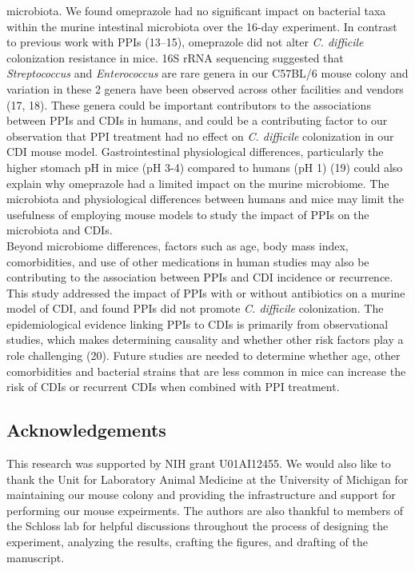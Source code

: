 \documentclass[11pt,]{article}
\begin{document}
microbiota. We found omeprazole had no significant impact on bacterial
taxa within the murine intestinal microbiota over the 16-day experiment.
In contrast to previous work with PPIs (13--15), omeprazole did not
alter \emph{C. difficile} colonization resistance in mice. 16S rRNA
sequencing suggested that \emph{Streptococcus} and \emph{Enterococcus}
are rare genera in our C57BL/6 mouse colony and variation in these 2
genera have been observed across other facilities and vendors (17, 18).
These genera could be important contributors to the associations between
PPIs and CDIs in humans, and could be a contributing factor to our
observation that PPI treatment had no effect on \emph{C. difficile}
colonization in our CDI mouse model. Gastrointestinal physiological
differences, particularly the higher stomach pH in mice (pH 3-4)
compared to humans (pH 1) (19) could also explain why omeprazole had a
limited impact on the murine microbiome. The microbiota and
physiological differences between humans and mice may limit the
usefulness of employing mouse models to study the impact of PPIs on the
microbiota and CDIs.\\
Beyond microbiome differences, factors such as age, body mass index,
comorbidities, and use of other medications in human studies may also be
contributing to the association between PPIs and CDI incidence or
recurrence. This study addressed the impact of PPIs with or without
antibiotics on a murine model of CDI, and found PPIs did not promote
\emph{C. difficile} colonization. The epidemiological evidence linking
PPIs to CDIs is primarily from observational studies, which makes
determining causality and whether other risk factors play a role
challenging (20). Future studies are needed to determine whether age,
other comorbidities and bacterial strains that are less common in mice
can increase the risk of CDIs or recurrent CDIs when combined with PPI
treatment.

\subsection{Acknowledgements}\label{acknowledgements}

This research was supported by NIH grant U01AI12455. We would also like
to thank the Unit for Laboratory Animal Medicine at the University of
Michigan for maintaining our mouse colony and providing the
infrastructure and support for performing our mouse expeirments. The
authors are also thankful to members of the Schloss lab for helpful
discussions throughout the process of designing the experiment,
analyzing the results, crafting the figures, and drafting of the
manuscript.
\end{document}
